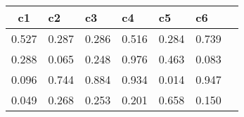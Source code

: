 \begin{table}[htbp]
\begin{tabular}{|l|l|l|l|l|l|l|}\hline  
 \multicolumn{1}{c}{ c1 }  & c2  & c3  & c4  & c5  & c6  \\ \hline  
    0.527 &     0.287 &     0.286 &     0.516 &     0.284 &     0.739 \\ \hline 
    0.288 &     0.065 &     0.248 &     0.976 &     0.463 &     0.083 \\ \hline 
    0.096 &     0.744 &     0.884 &     0.934 &     0.014 &     0.947 \\ \hline 
    0.049 &     0.268 &     0.253 &     0.201 &     0.658 &     0.150 \\ \hline 
  \end{tabular}
\end{table}
